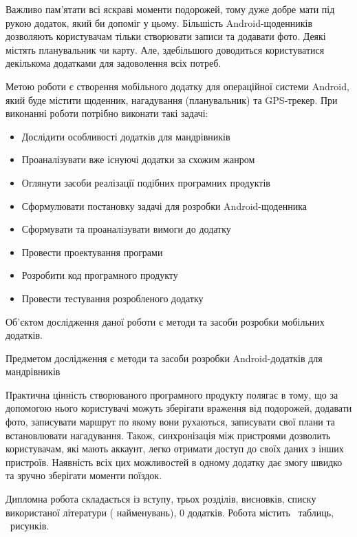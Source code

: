 \documentclass[../main.tex]{subfiles}
\begin{document}
Важливо пам'ятати всі яскраві моменти подорожей, тому дуже добре мати під рукою додаток, який би допоміг у цьому. Більшість Android-щоденників дозволяють користувачам тільки створювати записи та додавати фото. Деякі містять планувальник чи карту. Але, здебільшого доводиться користуватися декількома додатками для задоволення всіх потреб.

Метою роботи є створення мобільного додатку для операційної системи Android, який буде містити щоденник, нагадування (планувальник) та GPS-трекер.  
При виконанні роботи потрібно виконати такі задачі:
\begin{itemize}
\item Дослідити особливості додатків для мандрівників
\item Проаналізувати вже існуючі додатки за схожим жанром
\item Оглянути засоби реалізації подібних програмних продуктів
\item Сформулювати постановку задачі для розробки Android-щоденника
\item Сформувати та проаналізувати вимоги до додатку
\item Провести проектування програми
\item Розробити код програмного продукту
\item Провести тестування розробленого додатку
\end{itemize}

Об'єктом дослідження даної роботи є методи та засоби розробки мобільних додатків. 

Предметом дослідження є методи та засоби розробки Android-додатків для мандрівників

Практична цінність створюваного програмного продукту полягає в тому, що за допомогою нього користувачі можуть зберігати враження від подорожей, додавати фото, записувати маршрут по якому вони рухаються, записувати свої плани та встановлювати нагадування. Також, синхронізація між пристроями дозволить користувачам, які мають аккаунт, легко отримати доступ до своїх даних з інших пристроїв. Наявність всіх цих можливостей в одному додатку дає змогу швидко та зручно зберігати моменти поїздок.

Дипломна робота складається із вступу, трьох розділів, висновків, списку використаної літератури ( найменувань), 0 додатків. Робота містить \totaltables\ таблиць, \totalfigures\ рисунків. 
\end{document}
